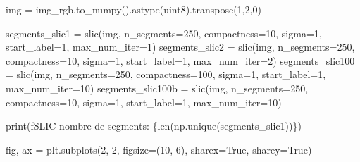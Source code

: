 \documentclass[
]{article}
\newenvironment{Shaded}{}{}
\newcommand{\BuiltInTok}[1]{\textcolor[rgb]{0.00,0.50,0.00}{#1}}
\newcommand{\DecValTok}[1]{\textcolor[rgb]{0.25,0.63,0.44}{#1}}
\newcommand{\NormalTok}[1]{#1}
\newcommand{\OperatorTok}[1]{\textcolor[rgb]{0.40,0.40,0.40}{#1}}
\newcommand{\SpecialCharTok}[1]{\textcolor[rgb]{0.25,0.44,0.63}{#1}}
\newcommand{\SpecialStringTok}[1]{\textcolor[rgb]{0.73,0.40,0.53}{#1}}
\newcommand{\StringTok}[1]{\textcolor[rgb]{0.25,0.44,0.63}{#1}}
\newcommand{\VariableTok}[1]{\textcolor[rgb]{0.10,0.09,0.49}{#1}}
\begin{document}
\label{ba40dce5}
\label{cb29}
\begin{Shaded}
\begin{Highlighting}[]
\NormalTok{img }\OperatorTok{=}\NormalTok{ img\_rgb.to\_numpy().astype(}\StringTok{\textquotesingle{}uint8\textquotesingle{}}\NormalTok{).transpose(}\DecValTok{1}\NormalTok{,}\DecValTok{2}\NormalTok{,}\DecValTok{0}\NormalTok{) }

\NormalTok{segments\_slic1 }\OperatorTok{=}\NormalTok{ slic(img, n\_segments}\OperatorTok{=}\DecValTok{250}\NormalTok{, compactness}\OperatorTok{=}\DecValTok{10}\NormalTok{, sigma}\OperatorTok{=}\DecValTok{1}\NormalTok{, start\_label}\OperatorTok{=}\DecValTok{1}\NormalTok{, max\_num\_iter}\OperatorTok{=}\DecValTok{1}\NormalTok{)}
\NormalTok{segments\_slic2 }\OperatorTok{=}\NormalTok{ slic(img, n\_segments}\OperatorTok{=}\DecValTok{250}\NormalTok{, compactness}\OperatorTok{=}\DecValTok{10}\NormalTok{, sigma}\OperatorTok{=}\DecValTok{1}\NormalTok{, start\_label}\OperatorTok{=}\DecValTok{1}\NormalTok{, max\_num\_iter}\OperatorTok{=}\DecValTok{2}\NormalTok{)}
\NormalTok{segments\_slic100 }\OperatorTok{=}\NormalTok{ slic(img, n\_segments}\OperatorTok{=}\DecValTok{250}\NormalTok{, compactness}\OperatorTok{=}\DecValTok{100}\NormalTok{, sigma}\OperatorTok{=}\DecValTok{1}\NormalTok{, start\_label}\OperatorTok{=}\DecValTok{1}\NormalTok{, max\_num\_iter}\OperatorTok{=}\DecValTok{10}\NormalTok{)}
\NormalTok{segments\_slic100b }\OperatorTok{=}\NormalTok{ slic(img, n\_segments}\OperatorTok{=}\DecValTok{250}\NormalTok{, compactness}\OperatorTok{=}\DecValTok{10}\NormalTok{, sigma}\OperatorTok{=}\DecValTok{1}\NormalTok{, start\_label}\OperatorTok{=}\DecValTok{1}\NormalTok{, max\_num\_iter}\OperatorTok{=}\DecValTok{10}\NormalTok{)}

\BuiltInTok{print}\NormalTok{(}\SpecialStringTok{f\textquotesingle{}SLIC nombre de segments: }\SpecialCharTok{\{}\BuiltInTok{len}\NormalTok{(np.unique(segments\_slic1))}\SpecialCharTok{\}}\SpecialStringTok{\textquotesingle{}}\NormalTok{)}

\NormalTok{fig, ax }\OperatorTok{=}\NormalTok{ plt.subplots(}\DecValTok{2}\NormalTok{, }\DecValTok{2}\NormalTok{, figsize}\OperatorTok{=}\NormalTok{(}\DecValTok{10}\NormalTok{, }\DecValTok{6}\NormalTok{), sharex}\OperatorTok{=}\VariableTok{True}\NormalTok{, sharey}\OperatorTok{=}\VariableTok{True}\NormalTok{)}


\end{Highlighting}
\end{Shaded}
\end{document}
